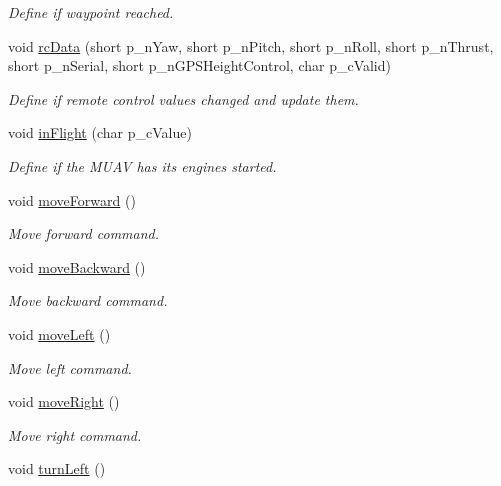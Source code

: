 \begin{DoxyCompactItemize}
\begin{DoxyCompactList}\small\item\em Define if waypoint reached. \end{DoxyCompactList}\item 
void \hyperlink{class_mission_control_afda9a6b76dd8159f08d7de68448c4e0b}{rc\-Data} (short p\-\_\-n\-Yaw, short p\-\_\-n\-Pitch, short p\-\_\-n\-Roll, short p\-\_\-n\-Thrust, short p\-\_\-n\-Serial, short p\-\_\-n\-G\-P\-S\-Height\-Control, char p\-\_\-c\-Valid)
\begin{DoxyCompactList}\small\item\em Define if remote control values changed and update them. \end{DoxyCompactList}\item 
void \hyperlink{class_mission_control_ac765641b805436f7200c1ca939df483f}{in\-Flight} (char p\-\_\-c\-Value)
\begin{DoxyCompactList}\small\item\em Define if the M\-U\-A\-V has its engines started. \end{DoxyCompactList}\item 
void \hyperlink{class_mission_control_a11782248e00a2497b4776a28d43509b4}{move\-Forward} ()
\begin{DoxyCompactList}\small\item\em Move forward command. \end{DoxyCompactList}\item 
void \hyperlink{class_mission_control_ad2e6d3b7a15ed375dda1c34be601822a}{move\-Backward} ()
\begin{DoxyCompactList}\small\item\em Move backward command. \end{DoxyCompactList}\item 
void \hyperlink{class_mission_control_a2430063e5b362deaa81ef0c6fc7e4453}{move\-Left} ()
\begin{DoxyCompactList}\small\item\em Move left command. \end{DoxyCompactList}\item 
void \hyperlink{class_mission_control_a3ccc57267deb95c1db453858e23d9bbc}{move\-Right} ()
\begin{DoxyCompactList}\small\item\em Move right command. \end{DoxyCompactList}\item 
void \hyperlink{class_mission_control_a38f7922f915215a4c388a616732ccd2a}{turn\-Left} ()

\end{DoxyCompactItemize}
